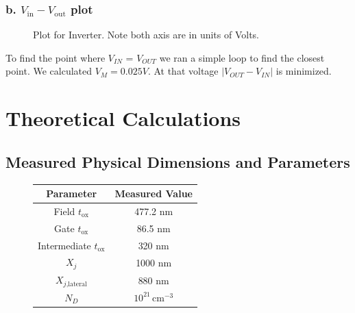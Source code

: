 \documentclass{article}
\begin{document}
\subsubsection{b. $V_{\text{in}}-V_{\text{out}}$ plot}
\begin{figure}[H]
\centering
{}
\caption{Plot for Inverter. Note both axis are in units of Volts.}
\end{figure}

To find the point where $V_{IN}$ = $V_{OUT}$ we ran a simple loop to find the closest point. We calculated $V_M = 0.025 V$. At that voltage $|V_{OUT} - V_{IN}|$ is minimized.

\section{Theoretical Calculations}

\subsection{Measured Physical Dimensions and Parameters}

\begin{figure}[H]
\centering
\begin{tabular}{c || c}
Parameter & Measured Value \\ \hline
Field $t_{\text{ox}}$ & 477.2 nm \\ \hline
Gate $t_{\text{ox}}$ & 86.5 nm \\ \hline
Intermediate $t_{\text{ox}}$ & 320 nm \\ \hline
$X_j$ & 1000 nm \\ \hline
$X_{j\text{,lateral}}$ & 880 nm \\ \hline
$N_D$ & $10^{21}\,\text{cm}^{-3}$ \\ \hline
\end{tabular}
\end{figure}
\end{document}
